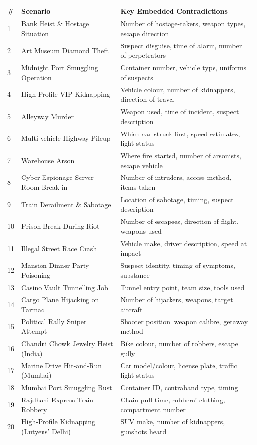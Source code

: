 \documentclass[12pt,a4paper]{report}
\begin{document}
\begin{center}
\begin{tabular}{p{0.5cm} p{5.5cm} p{7cm}}
\toprule
\textbf{\#} & \textbf{Scenario} & \textbf{Key Embedded Contradictions} \\
\midrule
1  & Bank Heist \& Hostage Situation   & Number of hostage-takers, weapon types, escape direction \\
2  & Art Museum Diamond Theft          & Suspect disguise, time of alarm, number of perpetrators \\
3  & Midnight Port Smuggling Operation & Container number, vehicle type, uniforms of suspects \\
4  & High-Profile VIP Kidnapping       & Vehicle colour, number of kidnappers, direction of travel \\
5  & Alleyway Murder                   & Weapon used, time of incident, suspect description \\
6  & Multi-vehicle Highway Pileup      & Which car struck first, speed estimates, light status \\
7  & Warehouse Arson                   & Where fire started, number of arsonists, escape vehicle \\
8  & Cyber-Espionage Server Room Break-in & Number of intruders, access method, items taken \\
9  & Train Derailment \& Sabotage      & Location of sabotage, timing, suspect description \\
10 & Prison Break During Riot          & Number of escapees, direction of flight, weapons used \\
11 & Illegal Street Race Crash         & Vehicle make, driver description, speed at impact \\
12 & Mansion Dinner Party Poisoning    & Suspect identity, timing of symptoms, substance \\
13 & Casino Vault Tunnelling Job       & Tunnel entry point, team size, tools used \\
14 & Cargo Plane Hijacking on Tarmac   & Number of hijackers, weapons, target aircraft \\
15 & Political Rally Sniper Attempt    & Shooter position, weapon calibre, getaway method \\
16 & Chandni Chowk Jewelry Heist (India) & Bike colour, number of robbers, escape gully \\
17 & Marine Drive Hit-and-Run (Mumbai) & Car model/colour, license plate, traffic light status \\
18 & Mumbai Port Smuggling Bust        & Container ID, contraband type, timing \\
19 & Rajdhani Express Train Robbery    & Chain-pull time, robbers' clothing, compartment number \\
20 & High-Profile Kidnapping (Lutyens' Delhi) & SUV make, number of kidnappers, gunshots heard \\
\bottomrule
\caption{20 Synthetic Benchmark Scenarios with Embedded Contradictions}
\label{tab:scenarios}
\end{tabular}
\end{center}
\end{document}
